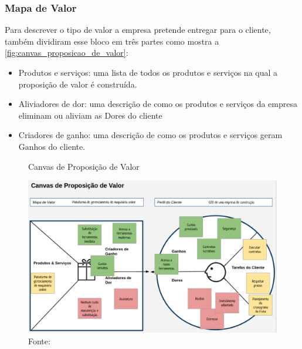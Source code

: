\subsubsection{Mapa de Valor}
\label{cha:mapa_de_valor}
Para descrever o tipo de valor a empresa pretende entregar para o cliente, também dividiram esse bloco em três partes como mostra a \autoref{fig:canvas_proposicao_de_valor}:
\begin{itemize}
\item Produtos e serviços: uma lista de todos os produtos e serviços na qual a proposição de valor é construída.
\item Aliviadores de dor: uma descrição de como os produtos e serviços da empresa eliminam ou aliviam as Dores do cliente
\item Criadores de ganho: uma descrição de como os produtos e serviços geram Ganhos do cliente. \cite{valueproposition}
\end{itemize}

\begin{figure}[H]
\caption{Canvas de Proposição de Valor}
\centerline{\includegraphics[scale=0.25]{img/canvas_proposicao_de_valor}}
\label{fig:canvas_proposicao_de_valor}
\caption* {Fonte: }
\end{figure}


